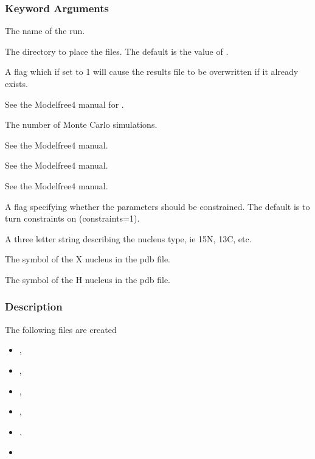  
 \subsubsection{Keyword Arguments} 

   The name of the run.   

   The directory to place the files.  The default is the value of .   

   A flag which if set to 1 will cause the results file to be overwritten if it already exists.   

   See the Modelfree4 manual for .   

   The number of Monte Carlo simulations.   

   See the Modelfree4 manual.   

   See the Modelfree4 manual.   

   See the Modelfree4 manual.   

   A flag specifying whether the parameters should be constrained.  The default is to turn constraints on (constraints=1).   

   A three letter string describing the nucleus type, ie 15N, 13C, etc.   

   The symbol of the X nucleus in the pdb file.   

   The symbol of the H nucleus in the pdb file.  

  

  
 \subsubsection{Description} 

 The following files are created 
  

 \begin{itemize} 
 \item[] ,  
 \item[] ,  
 \item[] ,  
 \item[] ,  
 \item[] .  
 \item[]  
 \end{itemize} 
  

